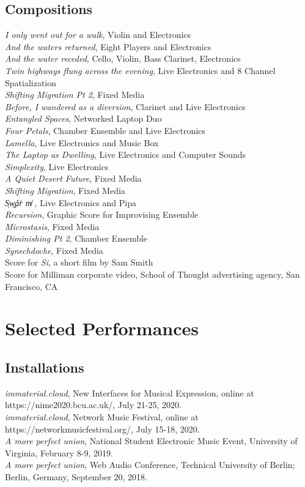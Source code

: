 \documentclass[10pt, a4paper]{article}
\newcommand{\years}[1]{\marginnote{\scriptsize #1}}
\begin{document}
\subsection*{Compositions}
\years{2017}
\textit{I only went out for a walk}, Violin and Electronics\\
\textit{And the waters returned}, Eight Players and Electronics \\
\textit{And the water receded}, Cello, Violin, Bass Clarinet, Electronics \\
\years{2016} 
\textit{Twin highways flung across the evening}, Live Electronics and 8 Channel Spatialization \\
\textit{Shifting Migration Pt 2}, Fixed Media \\
\textit{Before, I wandered as a diversion}, Clarinet and Live Electronics\\
\textit{Entangled Spaces}, Networked Laptop Duo \\
\textit{Four Petals}, Chamber Ensemble and Live Electronics\\
\textit{Lamella}, Live Electronics and Music Box\\
\textit{The Laptop as Dwelling}, Live Electronics and Computer Sounds\\
\textit{Simplexity}, Live Electronics \\
\textit{A Quiet Desert Future}, Fixed Media\\
\textit{Shifting Migration}, Fixed Media \\
\years{2015}
\textit{S̜w͚a̎r̍  m̸}  , Live Electronics and Pipa\\  
\textit{Recursion}, Graphic Score for Improvising Ensemble \\  
\textit{Microstasis}, Fixed Media\\  
\textit{Diminishing Pt 2}, Chamber Ensemble \\  
\textit{Synechdoche}, Fixed Media \\  
Score for \textit{Si}, a short film by Sam Smith\\  
Score for Milliman corporate video, School of Thought advertising agency, San Francisco, CA\\  

\section*{Selected Performances}

\subsection*{Installations}
\years{2020}\textit{immaterial.cloud}, New Interfaces for Musical Expression, online at https://nime2020.bcu.ac.uk/, July 21-25, 2020. \\
\textit{immaterial.cloud}, Network Music Festival, online at https://networkmusicfestival.org/, July 15-18, 2020.\\
\years{2019} \textit{A more perfect union}, National Student Electronic Music Event, University of Virginia, February 8-9, 2019.\\
\years{2018} \textit{A more perfect union}, Web Audio Conference, Technical University of Berlin; Berlin, Germany, September 20, 2018.
\end{document}
